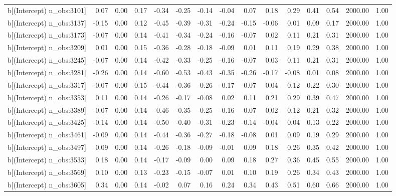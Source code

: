 \begin{table}[ht]
\begin{tabular}{rrrrrrrrrrrrrrr}
  b[(Intercept) n\_obs:3101] & 0.07 & 0.00 & 0.17 & -0.34 & -0.25 & -0.14 & -0.04 & 0.07 & 0.18 & 0.29 & 0.41 & 0.54 & 2000.00 & 1.00 \\ 
  b[(Intercept) n\_obs:3137] & -0.15 & 0.00 & 0.12 & -0.45 & -0.39 & -0.31 & -0.24 & -0.15 & -0.06 & 0.01 & 0.09 & 0.17 & 2000.00 & 1.00 \\ 
  b[(Intercept) n\_obs:3173] & -0.07 & 0.00 & 0.14 & -0.41 & -0.34 & -0.24 & -0.16 & -0.07 & 0.02 & 0.11 & 0.21 & 0.31 & 2000.00 & 1.00 \\ 
  b[(Intercept) n\_obs:3209] & 0.01 & 0.00 & 0.15 & -0.36 & -0.28 & -0.18 & -0.09 & 0.01 & 0.11 & 0.19 & 0.29 & 0.38 & 2000.00 & 1.00 \\ 
  b[(Intercept) n\_obs:3245] & -0.07 & 0.00 & 0.14 & -0.42 & -0.33 & -0.25 & -0.16 & -0.07 & 0.03 & 0.11 & 0.21 & 0.31 & 2000.00 & 1.00 \\ 
  b[(Intercept) n\_obs:3281] & -0.26 & 0.00 & 0.14 & -0.60 & -0.53 & -0.43 & -0.35 & -0.26 & -0.17 & -0.08 & 0.01 & 0.08 & 2000.00 & 1.00 \\ 
  b[(Intercept) n\_obs:3317] & -0.07 & 0.00 & 0.15 & -0.44 & -0.36 & -0.26 & -0.17 & -0.07 & 0.04 & 0.12 & 0.22 & 0.30 & 2000.00 & 1.00 \\ 
  b[(Intercept) n\_obs:3353] & 0.11 & 0.00 & 0.14 & -0.26 & -0.17 & -0.08 & 0.02 & 0.11 & 0.21 & 0.29 & 0.39 & 0.47 & 2000.00 & 1.00 \\ 
  b[(Intercept) n\_obs:3389] & -0.07 & 0.00 & 0.14 & -0.46 & -0.35 & -0.25 & -0.16 & -0.07 & 0.02 & 0.12 & 0.21 & 0.32 & 2000.00 & 1.00 \\ 
  b[(Intercept) n\_obs:3425] & -0.14 & 0.00 & 0.14 & -0.50 & -0.40 & -0.31 & -0.23 & -0.14 & -0.04 & 0.04 & 0.13 & 0.22 & 2000.00 & 1.00 \\ 
  b[(Intercept) n\_obs:3461] & -0.09 & 0.00 & 0.14 & -0.44 & -0.36 & -0.27 & -0.18 & -0.08 & 0.01 & 0.09 & 0.19 & 0.29 & 2000.00 & 1.00 \\ 
  b[(Intercept) n\_obs:3497] & 0.09 & 0.00 & 0.14 & -0.26 & -0.18 & -0.09 & -0.01 & 0.09 & 0.18 & 0.26 & 0.35 & 0.42 & 2000.00 & 1.00 \\ 
  b[(Intercept) n\_obs:3533] & 0.18 & 0.00 & 0.14 & -0.17 & -0.09 & 0.00 & 0.09 & 0.18 & 0.27 & 0.36 & 0.45 & 0.55 & 2000.00 & 1.00 \\ 
  b[(Intercept) n\_obs:3569] & 0.10 & 0.00 & 0.13 & -0.23 & -0.15 & -0.07 & 0.01 & 0.10 & 0.19 & 0.26 & 0.34 & 0.43 & 2000.00 & 1.00 \\ 
  b[(Intercept) n\_obs:3605] & 0.34 & 0.00 & 0.14 & -0.02 & 0.07 & 0.16 & 0.24 & 0.34 & 0.43 & 0.51 & 0.60 & 0.66 & 2000.00 & 1.00 \\ 

\end{tabular}
\end{table}
